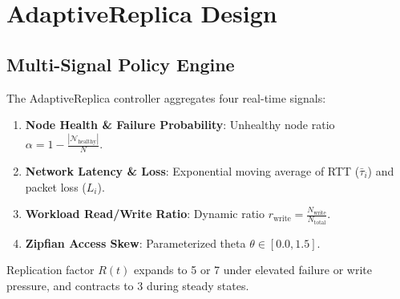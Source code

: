 \section{AdaptiveReplica Design}
\label{sec:methodology}

\subsection{Multi-Signal Policy Engine}
The AdaptiveReplica controller aggregates four real-time signals:
\begin{enumerate}
    \item \textbf{Node Health \& Failure Probability}: Unhealthy node ratio $\alpha = 1 - \frac{|\mathcal{N}_{\text{healthy}}|}{N}$.
    \item \textbf{Network Latency \& Loss}: Exponential moving average of RTT ($\bar{\tau}_i$) and packet loss ($L_i$).
    \item \textbf{Workload Read/Write Ratio}: Dynamic ratio $r_{\text{write}} = \frac{N_{\text{write}}}{N_{\text{total}}}$.
    \item \textbf{Zipfian Access Skew}: Parameterized theta $\theta \in [0.0, 1.5]$.
\end{enumerate}

Replication factor $R(t)$ expands to 5 or 7 under elevated failure or write pressure, and contracts to 3 during steady states.
